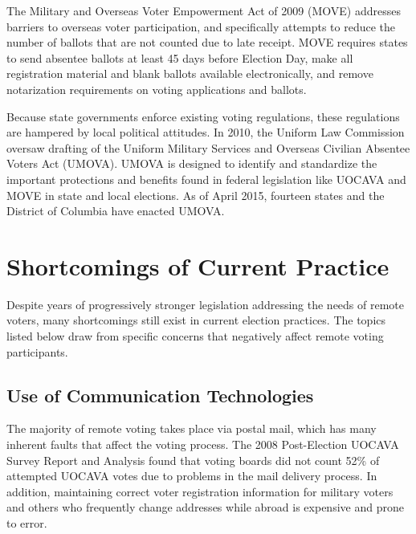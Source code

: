 The Military and Overseas Voter Empowerment Act of 2009 (MOVE)
addresses barriers to overseas voter participation, and specifically
attempts to reduce the number of ballots that are not counted due to
late receipt. MOVE requires states to send absentee ballots at least
45 days before Election Day, make all registration material and blank
ballots available electronically, and remove notarization requirements
on voting applications and ballots.



Because state governments enforce existing voting regulations, these
regulations are hampered by local political attitudes. In 2010, the
Uniform Law Commission oversaw drafting of the Uniform Military
Services and Overseas Civilian Absentee Voters Act (UMOVA). UMOVA is
designed to identify and standardize the important protections and
benefits found in federal legislation like UOCAVA and MOVE in state
and local elections. As of April 2015, fourteen states and the
District of Columbia have enacted UMOVA.

\section{Shortcomings of Current Practice}

Despite years of progressively stronger legislation addressing the
needs of remote voters, many shortcomings still exist in current
election practices. The topics listed below draw from specific
concerns that negatively affect remote voting participants.

\subsection{Use of Communication Technologies}
The majority of remote voting takes place via postal mail, which has
many inherent faults that affect the voting process. The 2008
Post-Election UOCAVA Survey Report and Analysis found that voting
boards did not count 52\% of attempted UOCAVA votes due to problems in
the mail delivery process. In addition, maintaining correct voter
registration information for military voters and others who frequently
change addresses while abroad is expensive and prone to error.

